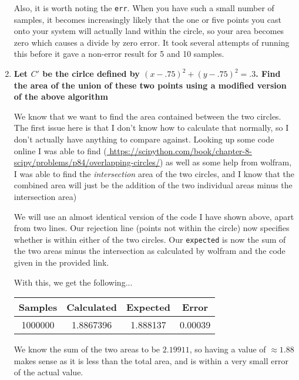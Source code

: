 \documentclass[11pt]{article}
\begin{document}
\begin{enumerate}
            Also, it is worth noting the \texttt{err}. When you have such a
            small number of samples, it becomes increasingly likely that the
            one or five points you cast onto your system will actually land
            within the circle, so your area becomes zero which causes a divide
            by zero error. It took several attempts of running this before it
            gave a non-error result for 5 and 10 samples.
            \newpage

        \item \textbf{Let $C'$ be the cirlce defined by $(x-.75)^2 + (y-.75)^2
            = .3$. Find the area of the union of these two points using a
            modified version of the above algorithm}

            We know that we want to find the area contained between the two
            circles. The first issue here is that I don't know how to calculate
            that normally, so I don't actually have anything to compare
            against. Looking up some code online I was able to find (\url{
            https://scipython.com/book/chapter-8-scipy/problems/p84/overlapping-circles/})
            as well as some help from wolfram, I was able to find the
            \textit{intersection} area of the two circles, and I know that the
            combined area will just be the addition of the two individual areas
            minus the intersection area)

            We will use an almost identical version of the code I have shown
            above, apart from two lines. Our rejection line (points not within
            the circle) now specifies whether is within either of the two
            circles. Our \texttt{expected} is now the sum of the two areas
            minus the intersection as calculated by wolfram and the code given
            in the provided link.

            With this, we get the following...
            \begin{center}
                \begin{tabular}{|| c || c | c | c ||}
                    \hline
                    Samples &   Calculated  &   Expected    &   Error   \\
                    \hline
                    \hline
                    1000000 &   1.8867396   &   1.888137    &   0.00039 \\
                    \hline
                    \hline
                \end{tabular}
            \end{center}
            We know the sum of the two areas to be $2.19911$, so having a value
            of $\approx 1.88$ makes sense as it is less than the total area,
            and is within a very small error of the actual value.
    \end{enumerate}
\end{document}
